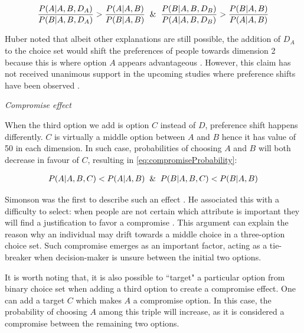 \documentclass[a4paper,12pt]{article}
\newcommand{\citeyearonly}[1]{\citeyearpar{#1}}
\begin{document}
\begin{equation}\label{eq:attractionProbability}
    \frac{P(A|A,B,D_A)}{P(B|A,B,D_A)} > \frac{P(A|A,B)}{P(B|A,B)} \And \frac{P(B|A,B,D_B)}{P(A|A,B,D_B)} > \frac{P(B|A,B)}{P(A|A,B)}
\end{equation}

Huber noted that albeit other explanations are still possible, the addition of $D_A$ to the choice set would shift the preferences of people towards dimension 2 because this is where option $A$ appears advantageous \cite{huberEtAl82, bhatia2013associations}. However, this claim has not received unanimous support in the upcoming studies where preference shifts have been observed \citep{wedell1991distinguishing}.

\textit{Compromise effect}

When the third option we add is option $C$ instead of $D$, preference shift happens differently. $C$ is virtually a middle option between $A$ and $B$ hence it has value of 50 in each dimension. In such case, probabilities of choosing $A$ and $B$ will both decrease in favour of $C$, resulting in \ref{eq:compromiseProbability}:

\begin{align}\label{eq:compromiseProbability}
    P(A|A,B,C) < P(A|A,B) \And P(B|A,B,C) < P(B|A,B)
\end{align}

Simonson was the first to describe such an effect \citeyearonly{simonson89}. He associated this with a difficulty to select: when people are not certain which attribute is important they will find a justification to favor a compromise \citep{simonson89}. This argument can explain the reason why an individual may drift towards a middle choice in a three-option choice set. Such compromise emerges as an important factor, acting as a tie-breaker when decision-maker is unsure between the initial two options. 

It is worth noting that, it is also possible to ``target" a particular option from binary choice set when adding a third option to create a compromise effect. One can add a target $C$ which makes $A$ a compromise option. In this case, the probability of choosing $A$ among this triple will increase, as it is considered a compromise between the remaining two options. 
\end{document}

